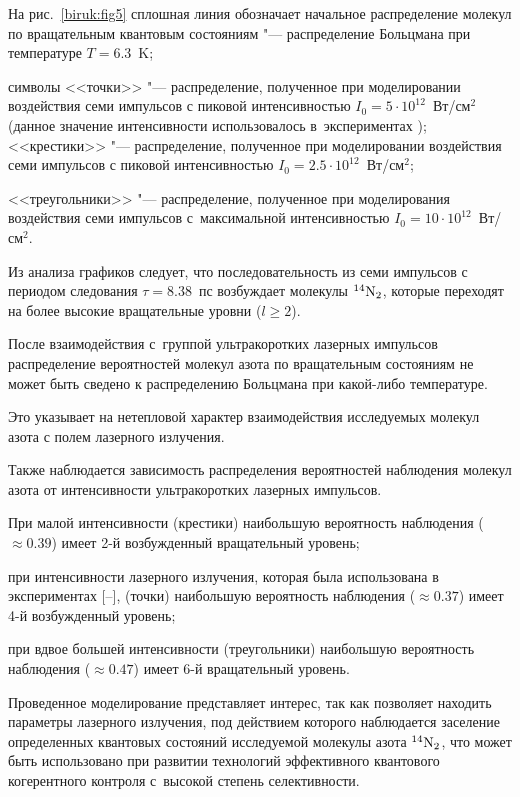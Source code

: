 На рис.~\ref{biruk:fig5}  сплошная линия обозначает начальное распределение молекул по вращательным квантовым состояниям "--- распределение Больцмана при температуре $T=6.3$~K; 

символы <<точки>> "--- распределение, полученное при моделировании воздействия семи импульсов с пиковой интенсивностью $I_{0}=5\cdot 10^{12}$~Вт/см$^2$ (данное значение интенсивности использовалось в~экспериментах \cite{biruk:Zhdanovich_12}); <<крестики>> "--- распределение, полученное при моделировании воздействия семи импульсов с пиковой интенсивностью $I_{0}=2.5\cdot 10^{12}$~Вт/см$^2$; 

<<треугольники>> "--- распределение, полученное при моделирования воздейст\-вия семи импульсов с~максимальной интенсивностью $I_{0}=10\cdot 10^{12}$~Вт/см$^2$.



Из анализа графиков следует, что последовательность из семи импульсов с периодом следования $\tau=8.38$~пс возбуждает молекулы $^{14}\rm N_2$, которые переходят на более высокие вращательные уровни ($l \geq 2$). 

После взаимодействия с~группой ультракоротких лазерных импульсов распределение вероятностей молекул азота по вращательным состояниям не может быть сведено к распределению Больцмана при какой-либо температуре. 

Это указывает на нетепловой характер взаимодействия исследуемых молекул азота с полем лазерного излучения.

Также наблюдается зависимость распределения вероятностей наблюдения молекул азота от интенсивности ультракоротких лазерных импульсов. 

При малой интенсивности (крестики) наибольшую вероятность наблюдения ($\approx 0.39$) имеет 2-й возбужденный вращательный уровень; 

при интенсивности лазерного излучения, которая была использована в экспериментах [--], (точки) наибольшую вероятность наблюдения ($\approx 0.37$) имеет 4-й возбужденный уровень; 

при вдвое большей интенсивности (треугольники)  наибольшую вероятность наблюдения ($\approx 0.47$) имеет 6-й вращательный уровень.



Проведенное моделирование представляет интерес, так как позволяет находить параметры лазерного излучения, под действием которого наблюдается заселение определенных квантовых состояний исследуемой молекулы азота $^{14}\rm N_2$, что может быть использовано при развитии технологий эффективного квантового когерентного контроля с~высокой степень селективности.





